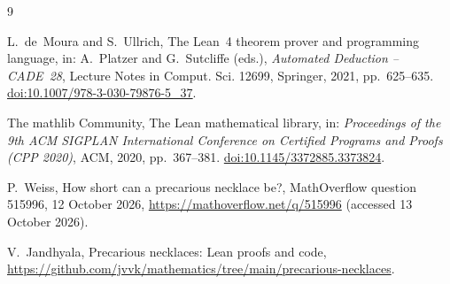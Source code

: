 \documentclass[11pt,a4paper]{article}
\theoremstyle{remark}
\begin{document}
\begin{thebibliography}{9}

 L.~de~Moura and S.~Ullrich, The Lean~4 theorem prover and
programming language, in: A.~Platzer and G.~Sutcliffe (eds.),
\emph{Automated Deduction -- CADE~28}, Lecture Notes in Comput. Sci.
12699, Springer, 2021, pp.~625--635.
\href{https://doi.org/10.1007/978-3-030-79876-5_37}{doi:10.1007/978-3-030-79876-5\_37}.

 The mathlib Community, The Lean mathematical library,
in: \emph{Proceedings of the 9th ACM SIGPLAN International Conference on
Certified Programs and Proofs (CPP 2020)}, ACM, 2020, pp.~367--381.
\href{https://doi.org/10.1145/3372885.3373824}{doi:10.1145/3372885.3373824}.

 P.~Weiss, How short can a precarious necklace be?,
MathOverflow question 515996, 12 October 2026,
\url{https://mathoverflow.net/q/515996} (accessed 13 October 2026).

 V.~Jandhyala, Precarious necklaces: Lean proofs and code,
\url{https://github.com/jvvk/mathematics/tree/main/precarious-necklaces}.

\end{thebibliography}
\end{document}
